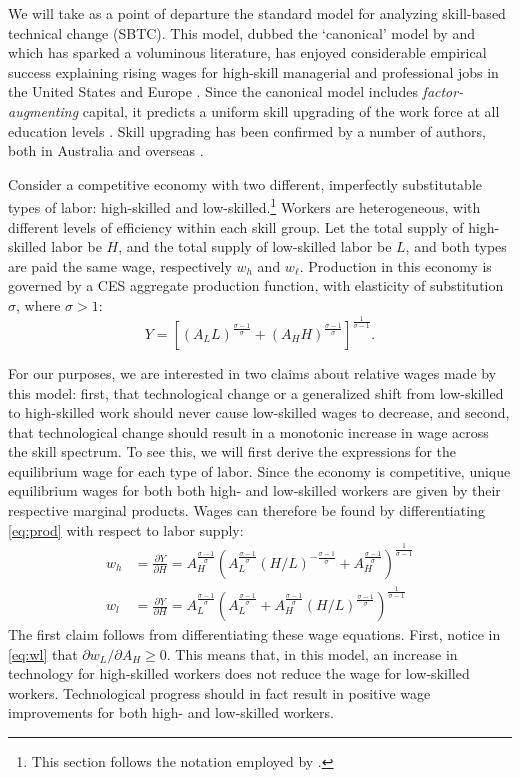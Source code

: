 \documentclass[a4paper,11pt,notitlepage]{article}
\begin{document}
We will take as a point of departure the standard model for analyzing skill-based technical change (SBTC). This model, dubbed the `canonical' model by \citet{Acemoglu2011} and which has sparked a voluminous literature, has enjoyed considerable empirical success explaining rising wages for high-skill managerial and professional jobs in the United States and Europe \citep{Katz1992}. Since the canonical model includes \emph{factor-augmenting} capital, it predicts a uniform skill upgrading of the work force at all education levels \citep{Levy2003}. Skill upgrading has been confirmed by a number of authors, both in Australia \citep{Esposto2012, Wooden2000, Cully1999} and overseas \citep{Autor2008}. 

Consider a competitive economy with two different, imperfectly substitutable types of labor: high-skilled and low-skilled.\footnote{This section follows the notation employed by \citet{Acemoglu2011}.} Workers are heterogeneous, with different levels of efficiency within each skill group. Let the total supply of high-skilled labor be $H$, and the total supply of low-skilled labor be $L$, and both types are paid the same wage, respectively $w_h$ and $w_\ell$. Production in this economy is governed by a CES aggregate production function, with elasticity of substitution $\sigma$, where $\sigma>1$:
\begin{equation}  \label{eq:prod}
Y = \left[
  \left(A_LL \right)^\frac{\sigma-1}{\sigma}
  +
  \left(A_HH \right)^\frac{\sigma-1}{\sigma}
  \right]^\frac{1}{\sigma-1}.
\end{equation}

For our purposes, we are interested in two claims about relative wages made by this model: first, that technological change or a generalized shift from low-skilled to high-skilled work should never cause low-skilled wages to decrease, and second, that technological change should result in a monotonic increase in wage across the skill spectrum. To see this, we will first derive the expressions for the equilibrium wage for each type of labor. Since the economy is competitive, unique equilibrium wages for both both high- and low-skilled workers are given by their respective marginal products. Wages can therefore be found by differentiating \eqref{eq:prod} with respect to labor supply:
\begin{align}
w_h &= \frac{\partial Y}{\partial H} 
     = A_H^\frac{\sigma-1}{\sigma}\left(
              A_L^{\frac{\sigma-1}{\sigma}} (H/L)^{-\frac{\sigma-1}{\sigma}} + A_H^{\frac{\sigma-1}{\sigma}}
        \right)^{\frac{1}{\sigma - 1}} \label{eq:wh} \\
w_l &= \frac{\partial Y}{\partial H} 
     = A_L^\frac{\sigma-1}{\sigma}\left(
              A_L^{\frac{\sigma-1}{\sigma}} + A_H^{\frac{\sigma-1}{\sigma}}(H/L)^{\frac{\sigma-1}{\sigma}}
        \right)^{\frac{1}{\sigma - 1}} \label{eq:wl}
\end{align}
The first claim follows from differentiating these wage equations. First, notice in \eqref{eq:wl} that $\partial w_L/\partial A_H \geq 0$. This means that, in this model, an increase in technology for high-skilled workers does not reduce the wage for low-skilled workers. Technological progress should in fact result in positive wage improvements for both high- and low-skilled workers. 
\end{document}
